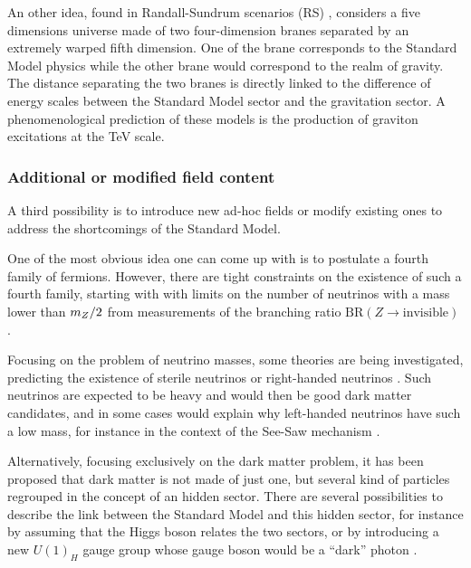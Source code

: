         An other idea, found in Randall-Sundrum scenarios (RS) \cite{RS}, considers a five
        dimensions universe made of two four-dimension branes separated by an extremely
        warped fifth dimension. One of the brane corresponds to the Standard Model physics
        while the other brane would correspond to the realm of gravity. The distance
        separating the two branes is directly linked to the difference of energy scales
        between the Standard Model sector and the gravitation sector. A phenomenological
        prediction of these models is the production of graviton excitations at the TeV
        scale.

        \subsubsection{Additional or modified field content}

        A third possibility is to introduce new ad-hoc fields or modify existing ones
        to address the shortcomings of the Standard Model.

        One of the most obvious idea
        one can come up with is to postulate a fourth family of fermions. However, there are
        tight constraints on the existence of such a fourth family, starting with with
        limits on the number of neutrinos with a mass lower than $m_{Z}/2$ from measurements
        of the branching ratio $\text{BR}(Z \rightarrow \text{invisible})$ \cite{PDFNumberOfNeutrinos}.

        Focusing on the problem of neutrino masses, some theories are being investigated,
        predicting the existence of sterile neutrinos or right-handed neutrinos \cite{RHNeutrinos}. Such neutrinos
        are expected to be heavy and would then be good dark matter candidates, and in some
        cases would explain why left-handed neutrinos have such a low mass, for instance
        in the context of the See-Saw mechanism \cite{Seesaw}.

        Alternatively, focusing exclusively on the dark matter problem, it has been proposed
        that dark matter is not made of just one, but several kind of particles regrouped
        in the concept of an hidden sector. There are several possibilities to describe
        the link between the Standard Model and this hidden sector, for instance by assuming
        that the Higgs boson relates the two sectors, or by introducing a new $U(1)_H$ gauge
        group whose gauge boson would be a ``dark'' photon \cite{darkPhoton}.

